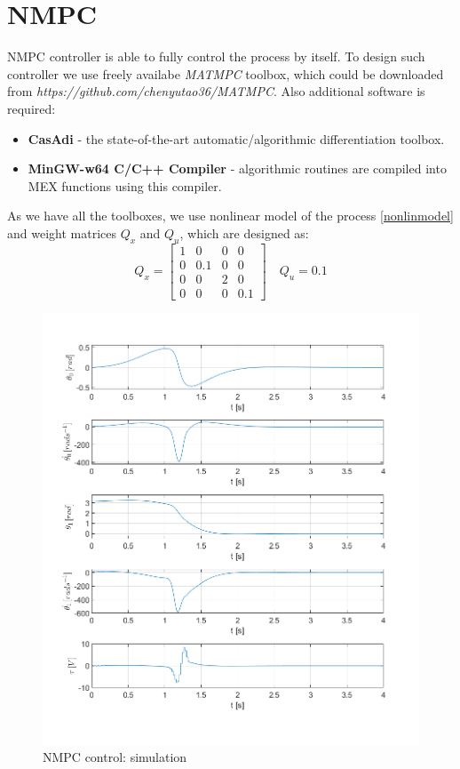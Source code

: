 \section{NMPC}
NMPC controller is able to fully control the process by itself. To design such controller we use freely availabe \textit{MATMPC} toolbox, which could be downloaded from \textit{https://github.com/chenyutao36/MATMPC}. Also additional software is required:
\begin{itemize}
	\item \textbf{CasAdi} - the state-of-the-art automatic/algorithmic differentiation toolbox.
	\item \textbf{MinGW-w64 C/C++ Compiler} - algorithmic routines are compiled
	into MEX functions using this compiler.
\end{itemize}
As we have all the toolboxes, we use nonlinear model of the process \ref{nonlinmodel} and weight matrices $Q_x$ and $Q_u$, which are designed as:
\begin{equation}
	Q_x = \begin{bmatrix}
	1&0&0&0\\
	0&0.1&0&0\\
	0&0&2&0\\
	0&0&0&0.1
	\end{bmatrix} \quad Q_u = 0.1
\end{equation}
\newpage
\begin{figure}[H]
	\centering
	\includegraphics[width=1.1\linewidth]{images/NMPC}
	\caption{NMPC control: simulation}
	\label{NMPC}
\end{figure}